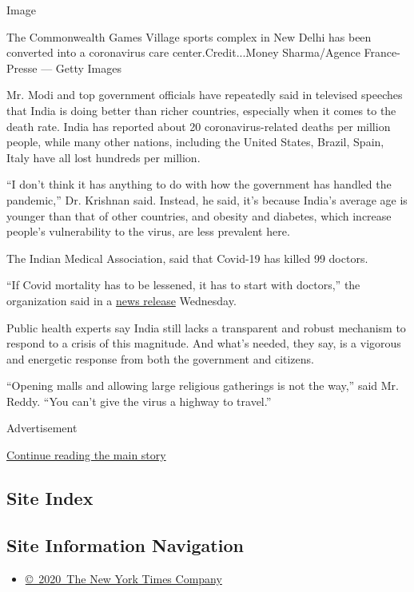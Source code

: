 Image

The Commonwealth Games Village sports complex in New Delhi has been
converted into a coronavirus care center.Credit...Money Sharma/Agence
France-Presse --- Getty Images

Mr. Modi and top government officials have repeatedly said in televised
speeches that India is doing better than richer countries, especially
when it comes to the death rate. India has reported about 20
coronavirus-related deaths per million people, while many other nations,
including the United States, Brazil, Spain, Italy have all lost hundreds
per million.

``I don't think it has anything to do with how the government has
handled the pandemic,'' Dr. Krishnan said. Instead, he said, it's
because India's average age is younger than that of other countries, and
obesity and diabetes, which increase people's vulnerability to the
virus, are less prevalent here.

The Indian Medical Association, said that Covid-19 has killed 99
doctors.

``If Covid mortality has to be lessened, it has to start with doctors,''
the organization said in a
\href{https://twitter.com/IMAIndiaOrg/status/1283324001096306689/photo/1}{news
release} Wednesday.

Public health experts say India still lacks a transparent and robust
mechanism to respond to a crisis of this magnitude. And what's needed,
they say, is a vigorous and energetic response from both the government
and citizens.

``Opening malls and allowing large religious gatherings is not the
way,'' said Mr. Reddy. ``You can't give the virus a highway to travel.''

Advertisement

\protect\hyperlink{after-bottom}{Continue reading the main story}

\hypertarget{site-index}{%
\subsection{Site Index}\label{site-index}}

\hypertarget{site-information-navigation}{%
\subsection{Site Information
Navigation}\label{site-information-navigation}}

\begin{itemize}
\tightlist
\item
  \href{https://help.nytimes.com/hc/en-us/articles/115014792127-Copyright-notice}{©~2020~The
  New York Times Company}
\end{itemize}

